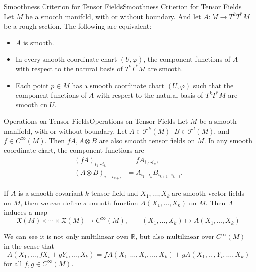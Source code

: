 \documentclass[../main.tex]{subfiles}
\begin{document}
\begin{proposition}{Smoothness Criterion for Tensor Fields}{Smoothness Criterion for Tensor Fields}
  Let $M$ be a smooth manifold, with or without boundary. And let $A: M \rightarrow T^k T^* M$ be a rough section. The following are equivalent:
  \begin{itemize}
    \item $A$ is smooth.
    \item In every smooth coordinate chart $(U, \varphi)$, the component functions of $A$ with respect to the natural basis of $T^k T^* M$ are smooth.
    \item Each point $p\in M$ has a smooth coordinate chart $(U, \varphi)$ such that the component functions of $A$ with respect to the natural basis of $T^k T^* M$ are smooth on $U$.
  \end{itemize}
\end{proposition}

\begin{proposition}{Operations on Tensor Fields}{Operations on Tensor Fields}
  Let $M$ be a smooth manifold, with or without boundary. Let $A\in \mathcal{T}^k(M)$, $B\in \mathcal{T}^l(M)$, and $f\in C^\infty(M)$. Then $fA, A \otimes B$ are also smooth tensor fields on $M$. In any smooth coordinate chart, the component functions are
  \begin{equation*}
    \begin{aligned}
      (fA)_{i_1 \cdots i_k} &= f A_{i_1 \cdots i_k}, \\
      (A \otimes B)_{i_1 \cdots i_{k+l}} &= A_{i_1 \cdots i_k} B_{i_{k+1} \cdots i_{k+l}}.
    \end{aligned}
  \end{equation*}
\end{proposition}

If $A$ is a smooth covariant $k$-tensor field and $X_1, \ldots, X_k$ are smooth vector fields on $M$, then we can define a smooth function $A(X_1, \ldots, X_k)$ on $M$. Then $A$ induces a map
\begin{equation*}
  \mathfrak{X}(M) \times \cdots \times \mathfrak{X}(M) \to C^\infty(M), \qquad (X_1, \ldots, X_k) \mapsto A(X_1, \ldots, X_k)
\end{equation*}

We can see it is not only multilinear over $\mathbb{R}$, but also multilinear over $C^\infty(M)$ in the sense that
\begin{equation*}
  A(X_1, \ldots, f X_i + g Y_i, \ldots, X_k) = f A(X_1, \ldots, X_i, \ldots, X_k) + g A(X_1, \ldots, Y_i, \ldots, X_k)
\end{equation*}
for all $f, g\in C^\infty(M)$.
\end{document}
